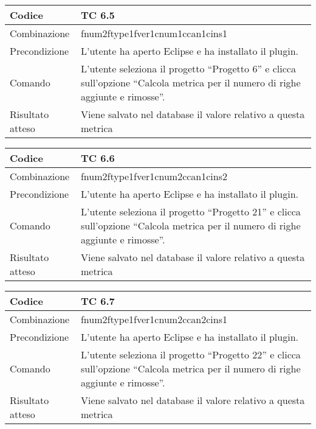 \begin{table}[ht]
\begin{tabular}{|p{3cm}|p{9cm}|}
\hline
\cellcolor{lightgray}Codice				& TC 6.5								\\
\hline
\cellcolor{lightgray}Combinazione		& fnum2ftype1fver1cnum1ccan1cins1 									\\
\hline
\cellcolor{lightgray}Precondizione		& L'utente ha aperto Eclipse e ha installato il plugin.			\\
\hline
\cellcolor{lightgray}Comando			& L'utente seleziona il progetto ``Progetto 6''  e clicca sull'opzione ``Calcola metrica per il numero di righe aggiunte e rimosse''.	\\
\hline
\cellcolor{lightgray}Risultato atteso	& Viene salvato nel database il valore relativo a questa metrica	\\
\hline
\end{tabular}
\end{table}

\begin{table}[ht]
\begin{tabular}{|p{3cm}|p{9cm}|}
\hline
\cellcolor{lightgray}Codice				& TC 6.6								\\
\hline
\cellcolor{lightgray}Combinazione		& fnum2ftype1fver1cnum2ccan1cins2								\\
\hline
\cellcolor{lightgray}Precondizione		& L'utente ha aperto Eclipse e ha installato il plugin.				\\
\hline
\cellcolor{lightgray}Comando			& L'utente seleziona il progetto ``Progetto 21''  e clicca sull'opzione ``Calcola metrica per il numero di righe aggiunte e rimosse''.	\\
\hline
\cellcolor{lightgray}Risultato atteso	& Viene salvato nel database il valore relativo a questa metrica	\\
\hline
\end{tabular}
\end{table}

\begin{table}[ht]
\begin{tabular}{|p{3cm}|p{9cm}|}
\hline
\cellcolor{lightgray}Codice				& TC 6.7								\\
\hline
\cellcolor{lightgray}Combinazione		& fnum2ftype1fver1cnum2ccan2cins1							\\
\hline
\cellcolor{lightgray}Precondizione		& L'utente ha aperto Eclipse e ha installato il plugin.									\\
\hline
\cellcolor{lightgray}Comando			& L'utente seleziona il progetto ``Progetto 22''  e clicca sull'opzione ``Calcola metrica per il numero di righe aggiunte e rimosse''.	\\
\hline
\cellcolor{lightgray}Risultato atteso	& Viene salvato nel database il valore relativo a questa metrica	\\
\hline
\end{tabular}
\end{table}

